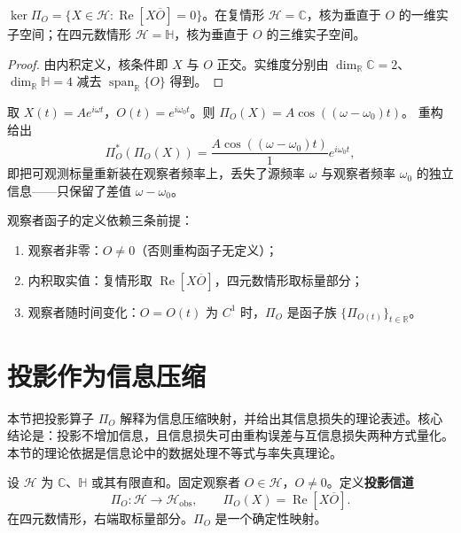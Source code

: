 \begin{corollary}[不可观测子空间]\label{cor:dyn_unobservable_subspace}
$\ker\Pi_O=\{X\in\mathcal H:\operatorname{Re}[X\overline O]=0\}$。在复情形 $\mathcal H=\mathbb C$，核为垂直于 $O$ 的一维实子空间；在四元数情形 $\mathcal H=\mathbb H$，核为垂直于 $O$ 的三维实子空间。
\end{corollary}

\begin{proof}
由内积定义，核条件即 $X$ 与 $O$ 正交。实维度分别由 $\dim_{\mathbb R}\mathbb C=2$、$\dim_{\mathbb R}\mathbb H=4$ 减去 $\operatorname{span}_{\mathbb R}\{O\}$ 得到。
\end{proof}

\begin{example}[单频源在旋转观察者下的重构]\label{ex:dyn_observer_reconstruction_example}
取 $X(t)=A e^{i\omega t}$，$O(t)=e^{i\omega_0 t}$。则 $\Pi_O(X)=A\cos((\omega-\omega_0)t)$。
重构给出
\[
\Pi_O^\ast(\Pi_O(X))=\frac{A\cos((\omega-\omega_0)t)}{1}e^{i\omega_0 t},
\]
即把可观测标量重新装在观察者频率上，丢失了源频率 $\omega$ 与观察者频率 $\omega_0$ 的独立信息——只保留了差值 $\omega-\omega_0$。
\end{example}

\begin{remark}[观察者函子的适用范围]\label{rem:dyn_observer_functor_scope}
观察者函子的定义依赖三条前提：
\begin{enumerate}[label=(\roman*)]
    \item 观察者非零：$O\neq 0$（否则重构函子无定义）；
    \item 内积取实值：复情形取 $\operatorname{Re}[X\overline O]$，四元数情形取标量部分；
    \item 观察者随时间变化：$O=O(t)$ 为 $C^1$ 时，$\Pi_O$ 是函子族 $\{\Pi_{O(t)}\}_{t\in\mathbb R}$。
\end{enumerate}
\end{remark}

\section{投影作为信息压缩}
\label{sec:dyn_projection_information}

本节把投影算子 $\Pi_O$ 解释为信息压缩映射，并给出其信息损失的理论表述。核心结论是：投影不增加信息，且信息损失可由重构误差与互信息损失两种方式量化。本节的理论依据是信息论中的数据处理不等式与率失真理论。

\begin{definition}[投影信道]\label{def:dyn_projection_channel}
设 $\mathcal H$ 为 $\mathbb C$、$\mathbb H$ 或其有限直和。固定观察者 $O\in\mathcal H$，$O\neq 0$。定义\textbf{投影信道}
\[
\Pi_O:\mathcal H\to\mathcal H_{\text{obs}},\qquad
\Pi_O(X)=\operatorname{Re}[X\overline O].
\]
在四元数情形，右端取标量部分。$\Pi_O$ 是一个确定性映射。
\end{definition}

